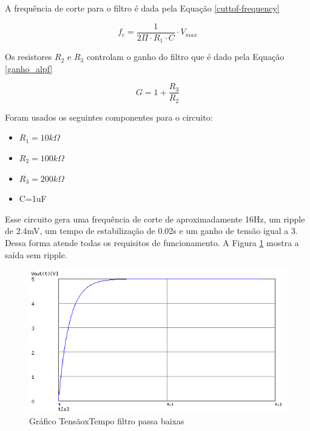 A frequência de corte para o filtro é dada pela Equação \ref{cuttof-frequency}

\begin{equation}\label{cutoff-frequency}
    f_{c}=\frac{ 1 }{ 2 \Pi \cdot R_{1}\cdot C } \cdot V_{max}
\end{equation}

Os resistores $R_{2}$ e $R_{3}$ controlam o ganho do filtro que é dado pela Equação \ref{ganho_alpf}

\begin{equation}\label{calc-analog-voltage}
    G= 1 + \frac{ R_{3} }{ R_{2} }
\end{equation}

Foram usados os seguintes componentes para o circuito:

\begin{itemize}
    \item $R_{1}=10k\Omega$
    \item $R_{2}=100k\Omega$
    \item $R_{3}=200k\Omega$
    \item C=1uF
\end{itemize}

Esse circuito gera uma frequência de corte de aproximadamente 16Hz, um ripple de 2.4mV, um tempo de estabilização de 0.02s e um ganho de tensão igual a 3. Dessa forma atende todas os requisitos de funcionamento. A Figura \ref{filter_out} mostra a saída sem ripple.

\begin{figure}[htbp]
    \centering
    \includegraphics[scale=0.3]{figuras/ripple-lpf.png}
    \caption{Gráfico TensãoxTempo filtro passa baixas}
    \label{filter_out}
\end{figure}



